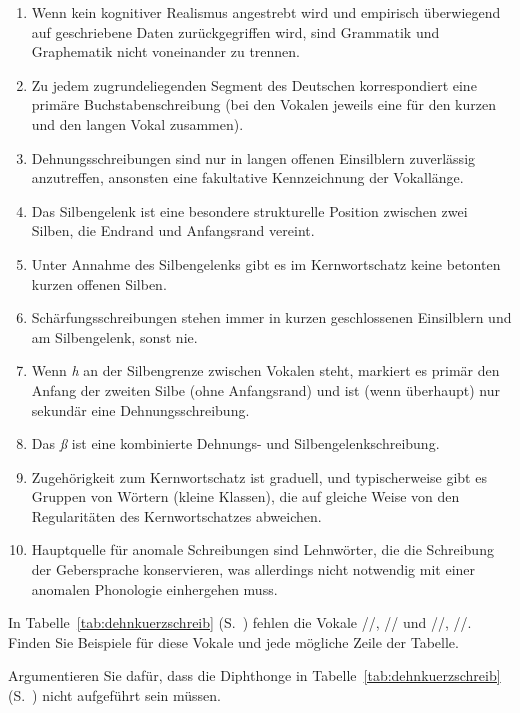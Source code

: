 \begin{enumerate}\Lf
  \item Wenn kein kognitiver Realismus angestrebt wird und empirisch überwiegend auf geschriebene Daten zurückgegriffen wird, sind Grammatik und Graphematik nicht voneinander zu trennen.
  \item Zu jedem zugrundeliegenden Segment des Deutschen korrespondiert eine primäre Buchstabenschreibung (bei den Vokalen jeweils eine für den kurzen und den langen Vokal zusammen).
  \item Dehnungsschreibungen sind nur in langen offenen Einsilblern zuverlässig anzutreffen, ansonsten eine fakultative Kennzeichnung der Vokallänge.
  \item Das Silbengelenk ist eine besondere strukturelle Position zwischen zwei Silben, die Endrand und Anfangsrand vereint.
  \item Unter Annahme des Silbengelenks gibt es im Kernwortschatz keine betonten kurzen offenen Silben.
  \item Schärfungsschreibungen stehen immer in kurzen geschlossenen Einsilblern und am Silbengelenk, sonst nie.
  \item Wenn \textit{h} an der Silbengrenze zwischen Vokalen steht, markiert es primär den Anfang der zweiten Silbe (ohne Anfangsrand) und ist (wenn überhaupt) nur sekundär eine Dehnungsschreibung.
  \item Das \textit{ß} ist eine kombinierte Dehnungs- und Silbengelenkschreibung.
  \item Zugehörigkeit zum Kernwortschatz ist graduell, und typischerweise gibt es Gruppen von Wörtern (kleine Klassen), die auf gleiche Weise von den Regularitäten des Kernwortschatzes abweichen.
  \item Hauptquelle für anomale Schreibungen sind Lehnwörter, die die Schreibung der Gebersprache konservieren, was allerdings nicht notwendig mit einer anomalen Phonologie einhergehen muss.
\end{enumerate}

\Uebungen

\Uebung \label{u141} In Tabelle~\ref{tab:dehnkuerzschreib} (S.~\pageref{tab:dehnkuerzschreib}) fehlen die Vokale //, // und /\textipa{\o}/, /\textipa{\oe}/.
Finden Sie Beispiele für diese Vokale und jede mögliche Zeile der Tabelle.

\Uebung[\tristar] \label{u142} Argumentieren Sie dafür, dass die Diphthonge in Tabelle~\ref{tab:dehnkuerzschreib} (S.~\pageref{tab:dehnkuerzschreib}) nicht aufgeführt sein müssen.

